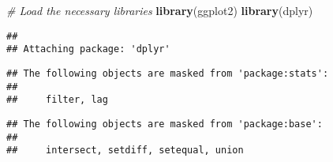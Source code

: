 \documentclass[
]{article}
\newenvironment{Shaded}{\begin{snugshade}}{\end{snugshade}}
\newcommand{\CommentTok}[1]{\textcolor[rgb]{0.56,0.35,0.01}{\textit{#1}}}
\newcommand{\FunctionTok}[1]{\textcolor[rgb]{0.13,0.29,0.53}{\textbf{#1}}}
\newcommand{\NormalTok}[1]{#1}
\begin{document}
\begin{Shaded}
\begin{Highlighting}[]
\CommentTok{\# Load the necessary libraries}
\FunctionTok{library}\NormalTok{(ggplot2)}
\FunctionTok{library}\NormalTok{(dplyr)}
\end{Highlighting}
\end{Shaded}

\begin{verbatim}
## 
## Attaching package: 'dplyr'
\end{verbatim}

\begin{verbatim}
## The following objects are masked from 'package:stats':
## 
##     filter, lag
\end{verbatim}

\begin{verbatim}
## The following objects are masked from 'package:base':
## 
##     intersect, setdiff, setequal, union
\end{verbatim}
\end{document}
